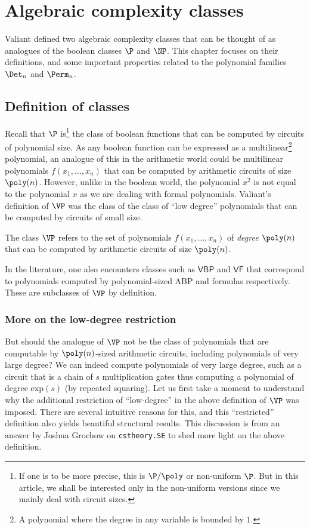 \chapter{Algebraic complexity classes} \label{chap-vpvnp}

Valiant \cite{v79} defined two algebraic complexity classes that can be thought of as analogues of the boolean classes $\P$ and $\NP$.
This chapter focuses on their definitions, and some important properties related to the polynomial families $\Det_n$ and $\Perm_n$.

\section{Definition of classes}

Recall that $\P$ is\footnote{If one is to be more precise, this is $\P/\poly$ or non-uniform $\P$.
But in this article, we shall be interested only in the non-uniform versions since we mainly deal with circuit sizes.} the class of boolean functions that can be computed by circuits of polynomial size.
As any boolean function can be expressed as a multilinear\footnote{A polynomial where the degree in any variable is bounded by $1$.} polynomial, an analogue of this in the arithmetic world could be multilinear polynomials $f(x_1,\dots, x_n)$ that can be computed by arithmetic circuits of size $\poly(n)$.
However, unlike in the boolean world, the polynomial $x^2$ is not equal to the polynomial $x$ as we are dealing with formal polynomials.
Valiant's definition of $\VP$ was the class of the class of ``low degree'' polynomials that can be computed by circuits of small size.

\begin{definition}[Valiant's $\P$]\label{defn:vp}
The class $\VP$ refers to the set of polynomials $f(x_1,\dots, x_n)$ of \emph{degree $\poly(n)$} that can be computed by arithmetic circuits of size $\poly(n)$.
\end{definition}

In the literature, one also encounters classes such as $\mathsf{VBP}$ and $\mathsf{VF}$ that correspond to polynomials computed by polynomial-sized ABP and formulas respectively.
These are subclasses of $\VP$ by definition.


\subsection*{More on the low-degree restriction}

But should the analogue of $\VP$ not be the class of polynomials that are computable by $\poly(n)$-sized arithmetic
circuits, including polynomials of very large degree?
We can indeed compute polynomials of very large degree, such as a circuit that is a chain of $s$ multiplication gates thus computing a polynomial of degree $\mathrm{exp}(s)$ (by repeated squaring).
Let us first take a moment to understand why the additional restriction of ``low-degree'' in the above definition of $\VP$ was imposed.
There are several intuitive reasons for this, and this ``restricted'' definition also yields beautiful structural results.
This discussion is from an answer by Joshua Grochow on \texttt{cstheory.SE} \cite{gro:SE} to shed more light on the above definition.

